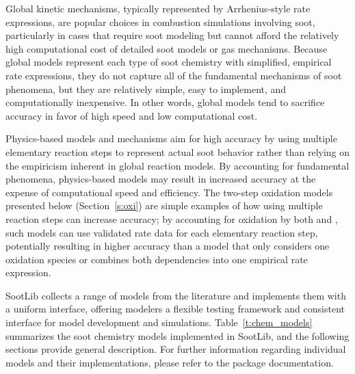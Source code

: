 \documentclass[preprint,letterpaper]{elsarticle}
\begin{document}
Global kinetic mechanisms, typically represented by Arrhenius-style rate expressions, are popular choices in combustion simulations involving soot, particularly in cases that require soot modeling but cannot afford the relatively high computational cost of detailed soot models or gas mechanisms. Because global models represent each type of soot chemistry with simplified, empirical rate expressions, they do not capture all of the fundamental mechanisms of soot phenomena, but they are relatively simple, easy to implement, and computationally inexpensive. In other words, global models tend to sacrifice accuracy in favor of high speed and low computational cost.

Physics-based models and mechanisms aim for high accuracy by using multiple elementary reaction steps to represent actual soot behavior rather than relying on the empiricism inherent in global reaction models. By accounting for fundamental phenomena, physics-based models may result in increased accuracy at the expense of computational speed and efficiency. The two-step oxidation models presented below (Section~\ref{s:oxi}) are simple examples of how using multiple reaction steps can increase accuracy; by accounting for oxidation by both  and , such models can use validated rate data for each elementary reaction step, potentially resulting in higher accuracy than a model that only considers one oxidation species or combines both dependencies into one empirical rate expression.

SootLib collects a range of models from the literature and implements them with a uniform interface, offering modelers a flexible testing framework and consistent interface for model development and simulations. Table~\ref{t:chem_models} summarizes the soot chemistry models implemented in SootLib, and the following sections provide general description. For further information regarding individual models and their implementations, please refer to the package documentation.
\end{document}
